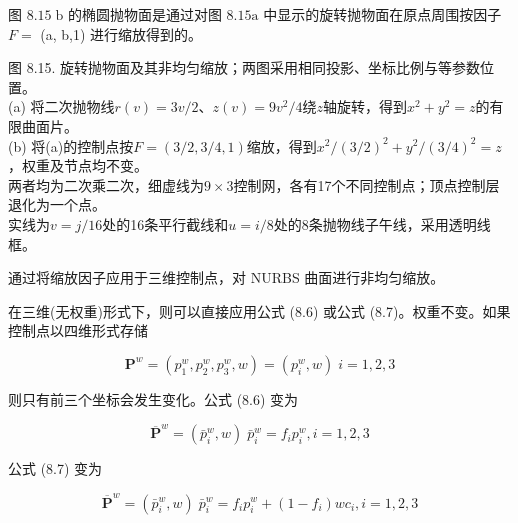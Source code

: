 \documentclass[../main.tex]{subfiles}
\begin{document}
图 \({8.15}\mathrm{\;b}\) 的椭圆抛物面是通过对图 \({8.15}\mathrm{a}\) 中显示的旋转抛物面在原点周围按因子 \(F =\) (a, b,1) 进行缩放得到的。

\begin{center}
\begin{minipage}{27cm}
\vspace*{.6\baselineskip}
\centering
{}
\par\medskip
{}
\par\smallskip
图 8.15. 旋转抛物面及其非均匀缩放；两图采用相同投影、坐标比例与等参数位置。\\
(a) 将二次抛物线$r(v)=3v/2$、$z(v)=9v^2/4$绕$z$轴旋转，得到$x^2+y^2=z$的有限曲面片。\\
(b) 将(a)的控制点按$F=(3/2,3/4,1)$缩放，得到$x^2/(3/2)^2+y^2/(3/4)^2=z$，权重及节点均不变。\\
两者均为二次乘二次，细虚线为$9\times3$控制网，各有17个不同控制点；顶点控制层退化为一个点。\\
实线为$v=j/16$处的16条平行截线和$u=i/8$处的8条抛物线子午线，采用透明线框。
\end{minipage}
\end{center}

通过将缩放因子应用于三维控制点，对 NURBS 曲面进行非均匀缩放。









在三维(无权重)形式下，则可以直接应用公式 (8.6) 或公式 (8.7)。权重不变。如果控制点以四维形式存储

\[
{\mathbf{P}}^{w} = \left( {{p}_{1}^{w},{p}_{2}^{w},{p}_{3}^{w},w}\right)  = \left( {{p}_{i}^{w},w}\right) \;i = 1,2,3
\]

则只有前三个坐标会发生变化。公式 (8.6) 变为

\[
{\overline{\mathbf{P}}}^{w} = \left( {{\bar{p}}_{i}^{w},w}\right) \;{\bar{p}}_{i}^{w} = {f}_{i}{p}_{i}^{w},i = 1,2,3 \tag{8.10}
\]

公式 (8.7) 变为

\[
{\overline{\mathbf{P}}}^{w} = \left( {{\bar{p}}_{i}^{w},w}\right) \;{\bar{p}}_{i}^{w} = {f}_{i}{p}_{i}^{w} + \left( {1 - {f}_{i}}\right) w{c}_{i},i = 1,2,3 \tag{8.11}
\]
\end{document}
